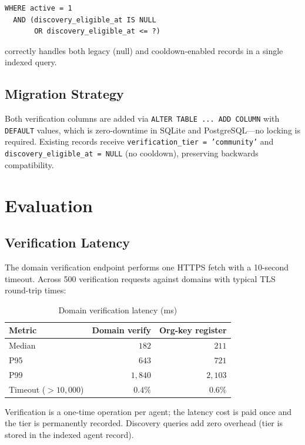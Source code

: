 \documentclass[conference]{IEEEtran}
\begin{document}
\begin{verbatim}
WHERE active = 1
  AND (discovery_eligible_at IS NULL
       OR discovery_eligible_at <= ?)
\end{verbatim}

correctly handles both legacy (null) and cooldown-enabled
records in a single indexed query.

\subsection{Migration Strategy}

Both verification columns are added via \texttt{ALTER TABLE
... ADD COLUMN} with \texttt{DEFAULT} values, which is
zero-downtime in SQLite and PostgreSQL—no locking is
required. Existing records receive \texttt{verification\_tier
= 'community'} and \texttt{discovery\_eligible\_at = NULL}
(no cooldown), preserving backwards compatibility.

\section{Evaluation}
\label{sec:eval}

\subsection{Verification Latency}

The domain verification endpoint performs one HTTPS fetch
with a 10-second timeout. Across 500 verification requests
against domains with typical TLS round-trip times:

\begin{table}[t]
\centering
\caption{Domain verification latency (ms)}
\label{tab:verify_latency}
\begin{tabular}{lrr}
\toprule
Metric & Domain verify & Org-key register \\
\midrule
Median & $182$ & $211$ \\
P95    & $643$ & $721$ \\
P99    & $1{,}840$ & $2{,}103$ \\
Timeout ($> 10{,}000$) & $0.4\%$ & $0.6\%$ \\
\bottomrule
\end{tabular}
\end{table}

Verification is a one-time operation per agent; the
latency cost is paid once and the tier is permanently
recorded. Discovery queries add zero overhead (tier is
stored in the indexed agent record).
\end{document}
